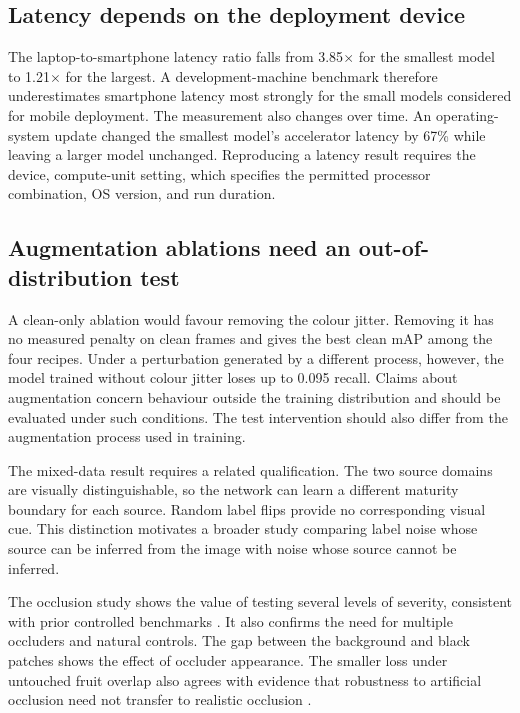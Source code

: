 \subsection{Latency depends on the deployment device}

The laptop-to-smartphone latency ratio falls from 3.85$\times$ for the smallest
model to 1.21$\times$ for the largest. A development-machine benchmark therefore
underestimates smartphone latency most strongly for the small models considered
for mobile deployment. The measurement also changes over time. An
operating-system update changed the smallest model's accelerator latency by
67\% while leaving a larger model unchanged. Reproducing a latency result
requires the device, compute-unit setting, which specifies the permitted
processor combination, OS version, and run duration.

\subsection{Augmentation ablations need an out-of-distribution test}

A clean-only ablation would favour removing the colour jitter. Removing it has
no measured penalty on clean frames and gives the best clean mAP among the four
recipes. Under a perturbation generated by a different process, however, the
model trained without colour jitter loses up to 0.095 recall. Claims about
augmentation concern behaviour outside the training distribution and should be
evaluated under such conditions. The test intervention should also differ from
the augmentation process used in training.

The mixed-data result requires a related qualification. The two source domains
are visually distinguishable, so the network can learn a different maturity
boundary for each source. Random label flips provide no corresponding visual
cue. This distinction motivates a broader study comparing label noise whose
source can be inferred from the image with noise whose source cannot be
inferred.

The occlusion study shows the value of testing several levels of severity,
consistent with prior controlled benchmarks \cite{gilroy2023benchmark}.
It also confirms the need for multiple occluders and natural controls. The gap
between the background and black patches shows the effect of occluder
appearance. The smaller loss under untouched fruit overlap also agrees with
evidence that robustness to artificial occlusion need not transfer to realistic
occlusion \cite{kassaw2026occlusion}.

